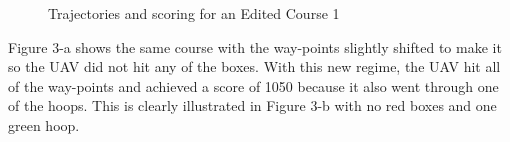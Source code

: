 \documentclass[12pt]{article}
\begin{document}
\begin{figure}[H]
	\caption{Trajectories and scoring for an Edited Course 1}
\end{figure}
Figure 3-a shows the same course with the way-points slightly shifted to make it so the UAV did not hit any of the boxes. With this new regime, the UAV hit all of the way-points and achieved a score of 1050 because it also went through one of the hoops. This is clearly illustrated in Figure 3-b with no red boxes and one green hoop. 
\end{document}
